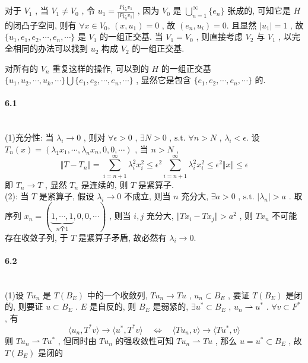 \documentclass[UTF8]{ctexart}
\begin{document}
        对于 $V_1$ , 当 $V_1\neq V_0$ , 令 $u_1=\frac{P_{V_0}v_1}{\vert P_{V_0}v_1\vert}$ ,
        因为 $V_0$ 是 $\bigcup^\infty_{n=1}\{e_n\}$ 张成的, 可知它是 $H$ 的闭凸子空间, 
        则有 $\forall x\in V_0$, $(x, u_1)=0$ , 故 $ (e_n,u_i)=0$.
        且显然 $\vert u_1\vert=1$ , 
        故 $\{u_1, e_1, e_2, \cdots, e_n, \cdots \}$ 是 $V_1$ 的一组正交基.
        当 $V_1 = V_0$ , 则直接考虑 $V_2$ 与 $V_1$ , 以完全相同的办法可以找到 $u_2$ 构成 $V_2$ 的一组正交基.

        对所有的 $V_n$ 重复这样的操作, 可以到的 $H$ 的一组正交基 $\{u_1, u_2, \cdots, u_k, \cdots \}\bigcup\{e_1, e_2, \cdots, e_n, \cdots \}$ , 显然它是包含 $\{e_1, e_2, \cdots, e_n, \cdots \}$ 的.
    
    \paragraph{6.1}\quad\\
        \noindent(1)\quad 充分性: 当 $\lambda_i \rightarrow 0$ , 则对 $\forall \epsilon > 0$ , $\exists N > 0$ , $\text{s.t. } \forall n > N$ , $\lambda_i < \epsilon$.
        设$T_n(x) = (\lambda_1 x_1, \cdots, \lambda_n x_n, 0, 0, \cdots)$ ,
        当 $n > N$ ,
        \[\Vert{T-T_n}\Vert = \sum^{\infty}_{i = n + 1}\lambda_i^2 x_i^2 \le \epsilon^2 \sum^{\infty}_{i = n + 1}\lambda_i^2 x_i^2 \le \epsilon^2 \Vert{x}\Vert \le \epsilon\]
        即 $T_n \rightarrow T$ , 显然 $T_n$ 是连续的, 则 $T$ 是紧算子.\\

        \noindent(2): 当 $T$ 是紧算子, 假设 $\lambda_i \rightarrow 0$ 不成立, 则当 $n$ 充分大, $\exists a > 0$ , $\text{s.t. } \vert{\lambda_n}\vert > a$ . 
        取序列 $x_n = (\underbrace{1, \cdots, 1}_{n\text{个}1}, 0, 0, \cdots)$ , 则当 $i, j$ 充分大, $\Vert{T x_i - T x_j}\Vert > a^2$ , 则 $T x_n$ 不可能存在收敛子列, 于 $T$ 是紧算子矛盾, 故必然有 $\lambda_i \rightarrow 0$.\\

    
    \paragraph{6.2}\quad\\
        \noindent(1)\quad 设 $T u_n$ 是 $T(B_E)$ 中的一个收敛列, $T u_n \rightarrow T u$ , $u_n \subset B_E$ , 要证 $T(B_E)$ 是闭的, 则要证 $u \subset B_E$ .
        $E$ 是自反的, 则 $B_E$ 是弱紧的, $\exists u^* \subset B_E$ , $u_n \rightharpoonup u^*$ . $\forall v \subset F^*$ , 有 
        \[\langle{u_n},{T^* v}\rangle \rightarrow \langle{u^*},{T^* v}\rangle
        \quad \Leftrightarrow \quad
        \langle{T u_n},{v}\rangle \rightarrow \langle{T u^*},{v}\rangle\]
        则 $T u_n \rightharpoonup T u^*$ , 但同时由 $T u_n$ 的强收敛性可知 $T u_n \rightharpoonup T u$ , 那么 $u = u^* \subset B_E$ , 故 $T(B_E)$ 是闭的\\
\end{document}
